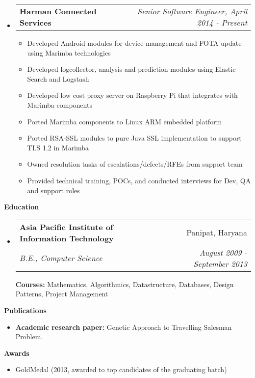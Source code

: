 \documentclass[letterpaper,11pt]{article}
\makeatletter
\newcommand{\resitem}[1]{\item #1 \vspace{-2pt}}
\newcommand{\resheading}[1]{{\large \colorbox{mygrey}{\begin{minipage}{\textwidth}{\textbf{#1 \vphantom{p\^{E}}}}\end{minipage}}}}
\newcommand{\ressubheading}[4]{
\begin{tabular*}{7.0in}{l@{\extracolsep{\fill}}r}
		\textbf{#1} & \textit{#4} \\
\end{tabular*}\vspace{-6pt}}
\newcommand{\ressubheadinged}[4]{
\begin{tabular*}{7.0in}{l@{\extracolsep{\fill}}r}
		\textbf{#1} & #2 \\
		\textit{#3} & \textit{#4}\\
\end{tabular*}\vspace{-6pt}}
\makeatother
\begin{document}
\begin{itemize}


\item
	\ressubheading{Harman Connected Services}{Pune, India}{Product Development}{Senior Software Engineer, April 2014 - Present}
	\begin{itemize}
		\resitem{Developed Android modules for device management and FOTA update using Marimba technologies}
		\resitem{Developed logcollector, analysis and prediction modules using Elastic Search and Logstash}
		\resitem{Developed low cost proxy server on Raspberry Pi that integrates with Marimba components}
		\resitem{Ported Marimba components to Linux ARM embedded platform}
		\resitem{Ported RSA-SSL modules to pure Java SSL implementation to support TLS 1.2 in Marimba}
		\resitem{Owned resolution tasks of escalations/defects/RFEs from support team}
		\resitem{Provided technical training, POCs, and conducted interviews for Dev, QA and support roles}
	\end{itemize}		

\end{itemize}

\resheading{Education}
\begin{itemize}
\item
	\ressubheadinged{Asia Pacific Institute of Information Technology}{Panipat, Haryana}{B.E., Computer Science}{August 2009 - September 2013}

\vspace{0.1in}

\textbf{Courses:} Mathematics, Algorithmics, Datastructure, Databases, Design Patterns, Project Management
\end{itemize}


\resheading{Publications}
\begin{itemize}
	\item {\bf  Academic research paper:} Genetic Approach to Travelling Salesman Problem.
\end{itemize}

\resheading{Awards}
\begin{itemize}
	\item GoldMedal (2013, awarded to top candidates of the graduating batch)
\end{itemize}
\end{document}
